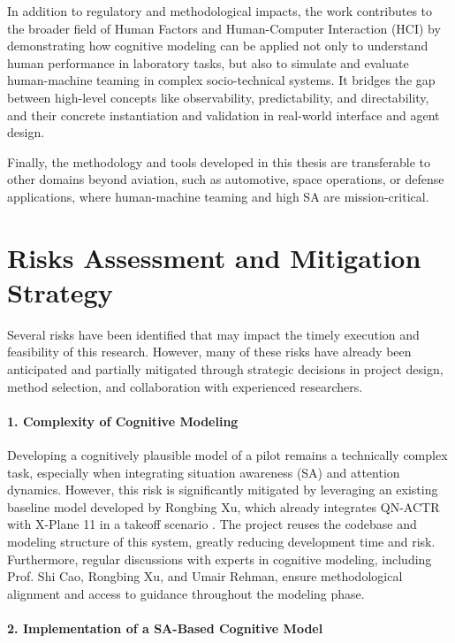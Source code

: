 \documentclass[12pt,a4paper]{article} %
\begin{document}
	In addition to regulatory and methodological impacts, the work contributes to the broader field of Human Factors and Human-Computer Interaction (HCI) by demonstrating how cognitive modeling can be applied not only to understand human performance in laboratory tasks, but also to simulate and evaluate human-machine teaming in complex socio-technical systems. It bridges the gap between high-level concepts like observability, predictability, and directability, and their concrete instantiation and validation in real-world interface and agent design.
	
	Finally, the methodology and tools developed in this thesis are transferable to other domains beyond aviation, such as automotive, space operations, or defense applications, where human-machine teaming and high SA are mission-critical.	
	
	\section{Risks Assessment and Mitigation Strategy}

	Several risks have been identified that may impact the timely execution and feasibility of this research. However, many of these risks have already been anticipated and partially mitigated through strategic decisions in project design, method selection, and collaboration with experienced researchers.

	\paragraph{1. Complexity of Cognitive Modeling}
	Developing a cognitively plausible model of a pilot remains a technically complex task, especially when integrating situation awareness (SA) and attention dynamics. However, this risk is significantly mitigated by leveraging an existing baseline model developed by Rongbing Xu, which already integrates QN-ACTR with X-Plane 11 in a takeoff scenario \parencite{xu_modeling_2021}. The project reuses the codebase and modeling structure of this system, greatly reducing development time and risk. Furthermore, regular discussions with experts in cognitive modeling, including Prof. Shi Cao, Rongbing Xu, and Umair Rehman, ensure methodological alignment and access to guidance throughout the modeling phase.

	\paragraph{2. Implementation of a SA-Based Cognitive Model}
\end{document}
